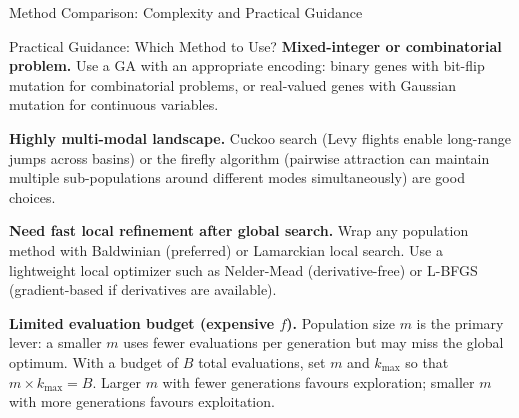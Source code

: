 \documentclass[aspectratio=169,10pt]{beamer}
\begin{document}
\begin{frame}[allowframebreaks]{Method Comparison: Complexity and Practical Guidance}
\begin{block}{Practical Guidance: Which Method to Use?}
    \textbf{Mixed-integer or combinatorial problem.}
    Use a GA with an appropriate encoding: binary genes with
    bit-flip mutation for combinatorial problems, or real-valued
    genes with Gaussian mutation for continuous variables.

    \textbf{Highly multi-modal landscape.}
    Cuckoo search (Levy flights enable long-range jumps across
    basins) or the firefly algorithm (pairwise attraction can
    maintain multiple sub-populations around different modes
    simultaneously) are good choices.

    \textbf{Need fast local refinement after global search.}
    Wrap any population method with Baldwinian (preferred) or
    Lamarckian local search.  Use a lightweight local optimizer
    such as Nelder-Mead (derivative-free) or L-BFGS (gradient-based
    if derivatives are available).

    \textbf{Limited evaluation budget (expensive $f$).}
    Population size $m$ is the primary lever: a smaller $m$ uses
    fewer evaluations per generation but may miss the global
    optimum.  With a budget of $B$ total evaluations, set $m$
    and $k_{\max}$ so that $m \times k_{\max} = B$.  Larger $m$
    with fewer generations favours exploration; smaller $m$ with
    more generations favours exploitation.
  \end{block}

\end{frame}
\end{document}
